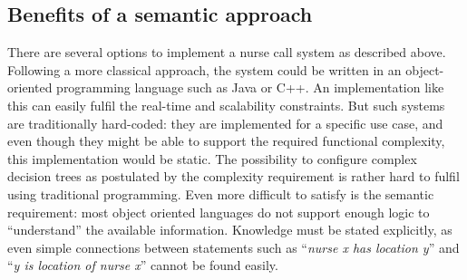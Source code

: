  

\subsection{Benefits of a semantic approach}
There are several options to implement a nurse call system as described above. Following a more classical approach, the system could be written in 
an object-oriented programming language 
such as Java or C++. An implementation like this can easily fulfil the real-time and scalability constraints.
But such systems are traditionally hard-coded: they are implemented for a specific use case, and even though 
they might be able to support the required functional complexity, this implementation would be static. The possibility to configure complex decision trees
as postulated by the complexity requirement is rather hard to fulfil using traditional programming. Even more difficult to satisfy is the semantic requirement:
most object oriented languages do not support enough logic to ``understand'' the available information. Knowledge must be stated explicitly, 
as even simple connections between statements such as ``\textit{nurse x has location y}'' and ``\textit{y is location of nurse x}'' cannot be found easily.

